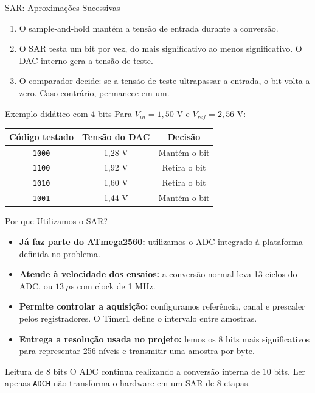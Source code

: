 \begin{frame}{SAR: Aproximações Sucessivas}
\begin{enumerate}
\item O sample-and-hold mantém a tensão de entrada durante a conversão.
\item O SAR testa um bit por vez, do mais significativo ao menos significativo. O DAC interno gera a tensão de teste.
\item O comparador decide: se a tensão de teste ultrapassar a entrada, o bit volta a zero. Caso contrário, permanece em um.
\end{enumerate}
\begin{block}{Exemplo didático com 4 bits}
Para $V_{in}=1{,}50$ V e $V_{ref}=2{,}56$ V:
\begin{center}
\small
\begin{tabular}{ccc}
\textbf{Código testado} & \textbf{Tensão do DAC} & \textbf{Decisão}\\\hline
\texttt{1000} & 1,28 V & Mantém o bit\\
\texttt{1100} & 1,92 V & Retira o bit\\
\texttt{1010} & 1,60 V & Retira o bit\\
\texttt{1001} & 1,44 V & Mantém o bit\\
\end{tabular}
\end{center}
\end{block}
\end{frame}

\begin{frame}{Por que Utilizamos o SAR?}
\begin{itemize}
\item \textbf{Já faz parte do ATmega2560:} utilizamos o ADC integrado à plataforma definida no problema.
\item \textbf{Atende à velocidade dos ensaios:} a conversão normal leva 13 ciclos do ADC, ou $13\ \mu$s com clock de 1 MHz.
\item \textbf{Permite controlar a aquisição:} configuramos referência, canal e prescaler pelos registradores. O Timer1 define o intervalo entre amostras.
\item \textbf{Entrega a resolução usada no projeto:} lemos os 8 bits mais significativos para representar 256 níveis e transmitir uma amostra por byte.
\end{itemize}
\begin{alertblock}{Leitura de 8 bits}
O ADC continua realizando a conversão interna de 10 bits. Ler apenas \texttt{ADCH} não transforma o hardware em um SAR de 8 etapas.
\end{alertblock}
\end{frame}
